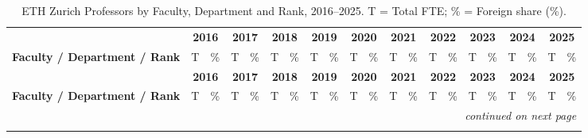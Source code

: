 \documentclass{article}
\begin{document}
\clearpage
\begin{longtable}{@{}l rr rr rr rr rr rr rr rr rr rr@{}}
  \caption{ETH Zurich Professors by Faculty, Department and Rank, 2016--2025. T = Total FTE; \% = Foreign share (\%).} \label{tab:eth_professors_part2} \\
  \toprule
   & \multicolumn{2}{c}{\textbf{2016}} & \multicolumn{2}{c}{\textbf{2017}} & \multicolumn{2}{c}{\textbf{2018}} & \multicolumn{2}{c}{\textbf{2019}} & \multicolumn{2}{c}{\textbf{2020}} & \multicolumn{2}{c}{\textbf{2021}} & \multicolumn{2}{c}{\textbf{2022}} & \multicolumn{2}{c}{\textbf{2023}} & \multicolumn{2}{c}{\textbf{2024}} & \multicolumn{2}{c}{\textbf{2025}} \\
  \cmidrule(lr){2-3} \cmidrule(lr){4-5} \cmidrule(lr){6-7} \cmidrule(lr){8-9} \cmidrule(lr){10-11} \cmidrule(lr){12-13} \cmidrule(lr){14-15} \cmidrule(lr){16-17} \cmidrule(lr){18-19} \cmidrule(lr){20-21}
  \textbf{Faculty / Department / Rank}  & T & \% & T & \% & T & \% & T & \% & T & \% & T & \% & T & \% & T & \% & T & \% & T & \% \\
  \midrule
  \endfirsthead

  \toprule
   & \multicolumn{2}{c}{\textbf{2016}} & \multicolumn{2}{c}{\textbf{2017}} & \multicolumn{2}{c}{\textbf{2018}} & \multicolumn{2}{c}{\textbf{2019}} & \multicolumn{2}{c}{\textbf{2020}} & \multicolumn{2}{c}{\textbf{2021}} & \multicolumn{2}{c}{\textbf{2022}} & \multicolumn{2}{c}{\textbf{2023}} & \multicolumn{2}{c}{\textbf{2024}} & \multicolumn{2}{c}{\textbf{2025}} \\
  \cmidrule(lr){2-3} \cmidrule(lr){4-5} \cmidrule(lr){6-7} \cmidrule(lr){8-9} \cmidrule(lr){10-11} \cmidrule(lr){12-13} \cmidrule(lr){14-15} \cmidrule(lr){16-17} \cmidrule(lr){18-19} \cmidrule(lr){20-21}
  \textbf{Faculty / Department / Rank}  & T & \% & T & \% & T & \% & T & \% & T & \% & T & \% & T & \% & T & \% & T & \% & T & \% \\
  \midrule
  \endhead

  \midrule
  \multicolumn{21}{r}{\textit{continued on next page}} \\
  \endfoot

  \bottomrule
  \endlastfoot


\end{longtable}
\end{document}
